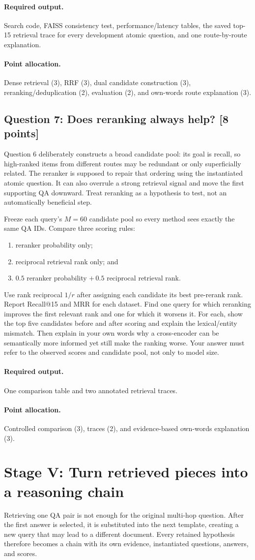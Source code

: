\documentclass[11pt]{article}
\newcommand{\question}[3]{%
  \subsection[Question #1: #2 (#3 points)]{Question #1: #2 \hfill [#3 points]}%
}
\newcommand{\deliverables}{\paragraph{Required output.}}
\newcommand{\grading}{\paragraph{Point allocation.}}
\begin{document}
\deliverables Search code, FAISS consistency test, performance/latency tables,
the saved top-15 retrieval trace for every development atomic question, and
one route-by-route explanation.

\grading Dense retrieval (3), RRF (3), dual candidate construction (3),
reranking/deduplication (2), evaluation (2), and own-words route explanation
(3).

\question{7}{Does reranking always help?}{8}

Question 6 deliberately constructs a broad candidate pool: its goal is recall,
so high-ranked items from different routes may be redundant or only
superficially related. The reranker is supposed to repair that ordering using
the instantiated atomic question. It can also overrule a strong retrieval
signal and move the first supporting QA downward. Treat reranking as a
hypothesis to test, not an automatically beneficial step.

Freeze each query's $M=60$ candidate pool so every method sees exactly the same
QA IDs. Compare three scoring rules:
\begin{enumerate}[label=(\roman*)]
  \item reranker probability only;
  \item reciprocal retrieval rank only; and
  \item $0.5$ reranker probability $+\,0.5$ reciprocal retrieval rank.
\end{enumerate}
Use rank reciprocal $1/r$ after assigning each candidate its best pre-rerank
rank. Report Recall@15 and MRR for each dataset. Find one query for which
reranking improves the first relevant rank and one for which it worsens it.
For each, show the top five candidates before and after scoring and explain the
lexical/entity mismatch. Then explain in your own words why a cross-encoder can
be semantically more informed yet still make the ranking worse. Your answer
must refer to the observed scores and candidate pool, not only to model size.

\deliverables One comparison table and two annotated retrieval traces.

\grading Controlled comparison (3), traces (2), and evidence-based own-words
explanation (3).

\section{Stage V: Turn retrieved pieces into a reasoning chain}

Retrieving one QA pair is not enough for the original multi-hop question.
After the first answer is selected, it is substituted into the next template,
creating a new query that may lead to a different document. Every retained
hypothesis therefore becomes a chain with its own evidence, instantiated
questions, answers, and scores.
\end{document}
